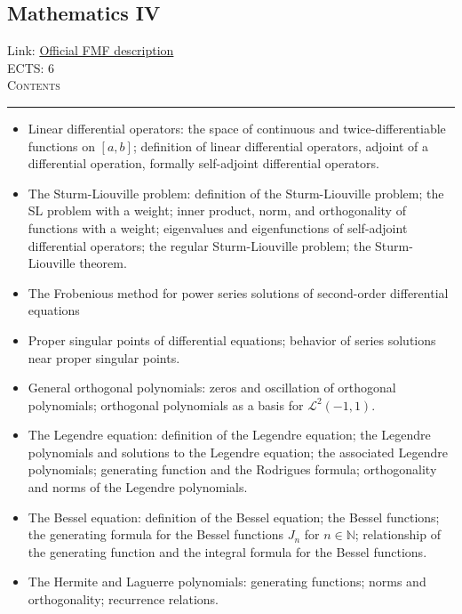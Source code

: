 \documentclass[11pt, a4paper]{article}
\newenvironment{course}[3]{
\subsection{#1}%
Link: \href{#2}{Official FMF description}\\%
ECTS: #3%
\vspace{1ex}
\\
{\large \textsc{Contents}}\\[-0.9ex]%
\rule{\textwidth}{0.5pt}
\vspace{-3ex}
}
{}
\newenvironment{chapter}[1]{
\begin{tcolorbox}[title=#1, breakable]
}
{\end{tcolorbox}}
\begin{document}
\begin{course}{Mathematics IV}{https://www.fmf.uni-lj.si/en/study-physics/programmes/1fiz/2020/7000777/courses/523/}{6}
\begin{chapter}{Sturm-Liouville theory and second-order homogeneous LDEs}
\begin{itemize}
            \item Linear differential operators: the space of continuous and twice-differentiable functions on $ [a, b] $; definition of linear differential operators, adjoint of a differential operation, formally self-adjoint differential operators.

            \item The Sturm-Liouville problem: definition of the Sturm-Liouville problem; the SL problem with a weight; inner product, norm, and orthogonality of functions with a weight; eigenvalues and eigenfunctions of self-adjoint differential operators; the regular Sturm-Liouville problem; the Sturm-Liouville theorem.
        
        \end{itemize}
        
    \end{chapter}

    \begin{chapter}{Power series solutions of second-order DEs}

        \begin{itemize}
        
            \item The Frobenious method for power series solutions of second-order differential equations

            \item Proper singular points of differential equations; behavior of series solutions near proper singular points.

            \item General orthogonal polynomials: zeros and oscillation of orthogonal polynomials; orthogonal polynomials as a basis for $ \mathcal{L}^{2}(-1, 1) $.

            \item The Legendre equation: definition of the Legendre equation; the Legendre polynomials and solutions to the Legendre equation; the associated Legendre polynomials; generating function and the Rodrigues formula; orthogonality and norms of the Legendre polynomials.

            \item The Bessel equation: definition of the Bessel equation; the Bessel functions; the generating formula for the Bessel functions $ J_{n} $ for $ n \in \mathbb{N} $; relationship of the generating function and the integral formula for the Bessel functions.

            \item The Hermite and Laguerre polynomials: generating functions; norms and orthogonality; recurrence relations.
        
        \end{itemize}
        
    \end{chapter}

\end{course}
\end{document}
